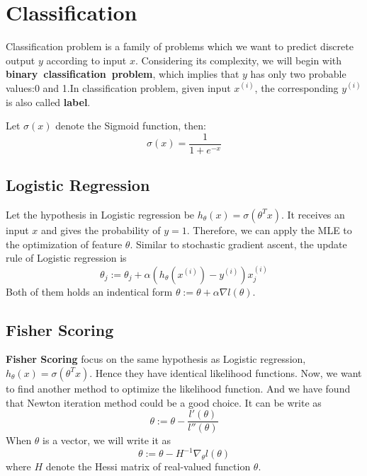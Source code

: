 \section{Classification}

Classification problem is a family of problems which we want to predict discrete output $y$ according to input $x$. Considering its complexity, we will begin with
\textbf{binary~classification~problem}, which implies that $y$ has only two probable values:0 and 1.In classification problem, given input $x^{(i)}$, the corresponding $y^{(i)}$ is also called
\textbf{label}.

\begin{define}
    Let $\sigma(x)$ denote the Sigmoid function, then:
    \[\sigma(x)=\frac{1}{1+e^{-x}}\]
\end{define}

\subsection{Logistic Regression}
Let the hypothesis in Logistic regression be $h_\theta(x) = \sigma(\theta^Tx)$. It receives an input $x$ and gives the probability of $y=1$. Therefore, we can apply the MLE to the optimization of 
feature $\theta$. Similar to stochastic gradient ascent, the update rule of Logistic regression is 
\[\theta_j := \theta_j + \alpha(h_\theta(x^{(i)})-y^{(i)})x^{(i)}_j\]
Both of them holds an indentical form $\theta := \theta + \alpha\nabla l(\theta)$.

\subsection{Fisher Scoring}

\textbf{Fisher Scoring} focus on the same hypothesis as Logistic regression, $h_\theta(x) = \sigma(\theta^Tx)$. Hence they have identical likelihood functions. Now, we want to find another method to
optimize the likelihood function. And we have found that Newton iteration method could be a good choice. It can be write as 
\[\theta := \theta - \frac{l'(\theta)}{l''(\theta)}\]
When $\theta$ is a vector, we will write it as 
\[\theta:=\theta-H^{-1}\nabla_\theta l(\theta)\]
where $H$ denote the Hessi matrix of real-valued function $\theta$.  
